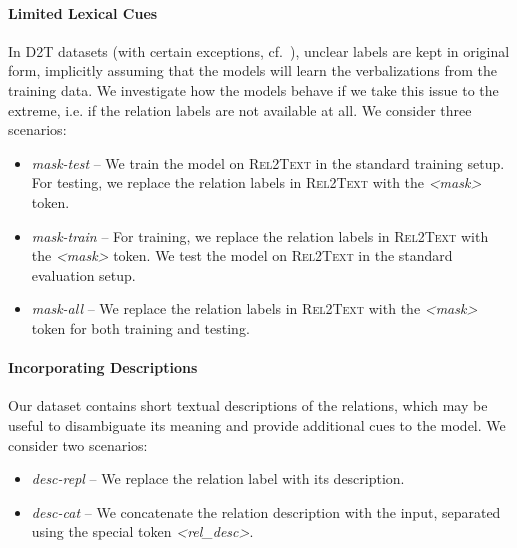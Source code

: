 \paragraph{Limited Lexical Cues} In D2T datasets (with certain exceptions, cf.\ \citet{gardent2017creating}), unclear labels are kept in original form, implicitly assuming that the models will learn the verbalizations from the training data. We investigate how the models behave if we take this issue to the extreme, i.e. if the relation labels are not available at all. We consider three scenarios:
\begin{itemize}
    \item \textit{mask-test} -- We train the model on \textsc{Rel2Text} in the standard training setup. For testing, we replace the relation labels in  \textsc{Rel2Text} with the \textit{<mask>} token.
    \item \textit{mask-train} -- For training, we replace the relation labels in  \textsc{Rel2Text} with the \textit{<mask>} token. We test the model on \textsc{Rel2Text} in the standard evaluation setup.
    \item \textit{mask-all} -- We replace the relation labels in  \textsc{Rel2Text} with the \textit{<mask>} token for both training and testing.
\end{itemize}


\paragraph{Incorporating Descriptions} Our dataset contains short textual descriptions of the relations, which may be useful to disambiguate its meaning and provide additional cues to the model. We consider two scenarios:
\begin{itemize}
    \item \textit{desc-repl} -- We replace the relation label with its description.
    \item \textit{desc-cat} -- We concatenate the relation description with the input, separated using the special token \textit{<rel\_desc>}.
\end{itemize}



